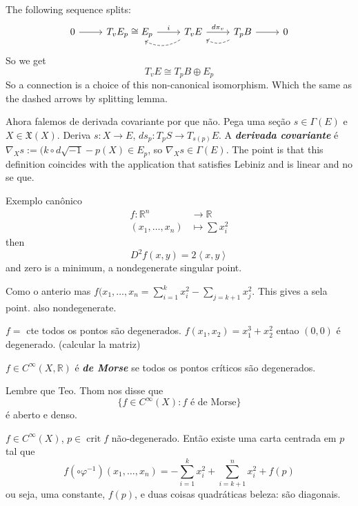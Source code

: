 \begin{exercise}
The following sequence splits:
\[\begin{tikzcd}0\arrow[r]&T_vE_p \cong E_p\arrow[r,"i"]&\arrow[l,dashed,bend left]T_vE\arrow[r,"d\pi_v"]&T_pB\arrow[l,dashed, bend left]\arrow[r]&0\end{tikzcd}\]
So we get
\[T_vE \cong T_pB \oplus  E_p\]
So a connection is a choice of this non-canonical isomorphism. Which the same as the dashed arrows by splitting lemma.

Ahora falemos de derivada covariante por que não. Pega uma seção \(s \in \Gamma(E)\) e \( X \in \mathfrak{X}(X)\). Deriva \(s: X \to E\), \(ds_p:T_pS \to T_{s(p)}E\). A \textit{\textbf{derivada covariante }} é \(\nabla_X s:=(k \circ d\sqrt{-1}-p(X)\in E_p\), so \(\nabla_Xs \in \Gamma(E)\). The point is that this definition coincides with the application that satisfies Lebiniz and is linear and no se que.
\end{exercise}

\begin{thing6}{Exemplo canônico}\leavevmode
\begin{align*}
	f: \mathbb{R}^n &\longrightarrow \mathbb{R} \\
	(x_1,\ldots,x_n) &\longmapsto \sum x_i^2
\end{align*}
then
 \[D^2f(x,y)=2 \left<x,y\right>\]
 and zero is a minimum, a nondegenerate singular point.
\end{thing6}

\begin{example}\leavevmode
Como o anterio mas \(f(x_1,\ldots,x_n=\sum_{i=1}^k x_i^2 -\sum_{j=k+1}x_j^2\). This gives a sela point. also nondegenerate.
\end{example}

\begin{example}\leavevmode
\(f=\) cte todos os pontos são degenerados. \(f(x_1,x_2)=x_1^3+x_2^2\) entao \((0,0)\) é degenerado. (calcular la matriz)
\end{example}

\begin{defn}\leavevmode
\(f \in C^\infty (X,\mathbb{R})\) é \textit{\textbf{de Morse}} se todos os pontos críticos são degenerados.
\end{defn}

\begin{prop}\leavevmode
Lembre que Teo. Thom nos disse que
\[\{ f \in C^\infty(X): f\text{ é de Morse} \}\]
é aberto e denso.
\end{prop}

\begin{lemma}[de Morse]\leavevmode
\(f \in C^\infty(X)\), \(p \in \operatorname{crit}f\) não-degenerado. Então existe uma carta centrada em \(p\) tal que
\[f(\circ \varphi^{-1})(x_1,\ldots,x_n)=-\sum_{i=1}^k x_i^2+ \sum_{i=k+1}^nx_i^2+f(p)\]
ou seja, uma constante, \(f(p)\), e duas coisas quadráticas beleza: são diagonais.
\end{lemma}

